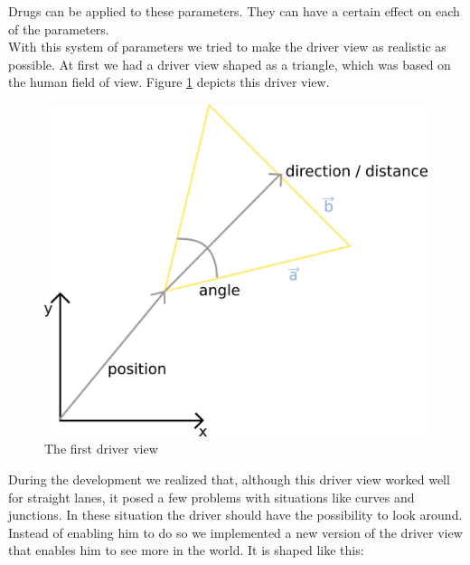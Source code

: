 \noindent Drugs can be applied to these parameters. They can have a certain effect
on each of the parameters. \\

\noindent With this system of parameters we tried to make the driver view as 
realistic as possible. At first we had a driver view shaped as a triangle, 
which was based on the human field of view.
Figure \ref{fig:driverView} depicts this driver view.

\begin{figure}[H]
\begin{center}
\includegraphics[scale=0.4]{images/driverview.png}
\end{center}
\caption{The first driver view}
\label{fig:driverView}
\end{figure}

\noindent During the development we realized that, although this driver
view worked well for straight lanes, it posed a few problems with
situations like curves and junctions.  In these situation the driver
should have the possibility to look around. Instead of enabling him to
do so we implemented a new version of the driver view that enables him
to see more in the world. It is shaped like this:

